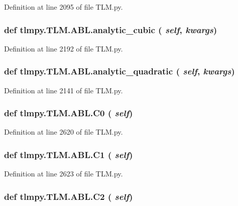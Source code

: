 Definition at line 2095 of file TLM.py.\hypertarget{classtlmpy_1_1TLM_1_1ABL_a4f00bd1fa90c964896b1299d2c0ad08c}{
\subsubsection[{analytic\_\-cubic}]{\setlength{\rightskip}{0pt plus 5cm}def tlmpy.TLM.ABL.analytic\_\-cubic ( {\em self}, \/   {\em kwargs})}}
\label{classtlmpy_1_1TLM_1_1ABL_a4f00bd1fa90c964896b1299d2c0ad08c}


Definition at line 2192 of file TLM.py.\hypertarget{classtlmpy_1_1TLM_1_1ABL_a35a1e5535c445547850b5024c93998af}{
\subsubsection[{analytic\_\-quadratic}]{\setlength{\rightskip}{0pt plus 5cm}def tlmpy.TLM.ABL.analytic\_\-quadratic ( {\em self}, \/   {\em kwargs})}}
\label{classtlmpy_1_1TLM_1_1ABL_a35a1e5535c445547850b5024c93998af}


Definition at line 2141 of file TLM.py.\hypertarget{classtlmpy_1_1TLM_1_1ABL_a03151e2bcd2d83fb0d3e6ab50144f753}{
\subsubsection[{C0}]{\setlength{\rightskip}{0pt plus 5cm}def tlmpy.TLM.ABL.C0 ( {\em self})}}
\label{classtlmpy_1_1TLM_1_1ABL_a03151e2bcd2d83fb0d3e6ab50144f753}


Definition at line 2620 of file TLM.py.\hypertarget{classtlmpy_1_1TLM_1_1ABL_a4c80a19f540e23e2256dce74731cb1e4}{
\subsubsection[{C1}]{\setlength{\rightskip}{0pt plus 5cm}def tlmpy.TLM.ABL.C1 ( {\em self})}}
\label{classtlmpy_1_1TLM_1_1ABL_a4c80a19f540e23e2256dce74731cb1e4}


Definition at line 2623 of file TLM.py.\hypertarget{classtlmpy_1_1TLM_1_1ABL_a6e15dafe4ae4104b321f080b73b6c83e}{
\subsubsection[{C2}]{\setlength{\rightskip}{0pt plus 5cm}def tlmpy.TLM.ABL.C2 ( {\em self})}}
\label{classtlmpy_1_1TLM_1_1ABL_a6e15dafe4ae4104b321f080b73b6c83e}


